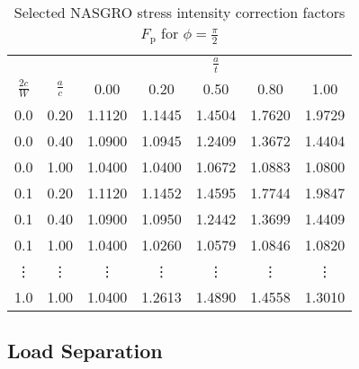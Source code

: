 \begin{table}
\caption[Selected NASGRO stress intensity correction factors $F_\text{p}$ for $\phi=\frac{\pi}{2}$]{\label{tab:nasgro-a-tip} Selected NASGRO stress intensity correction factors $F_\text{p}$ for $\phi=\frac{\pi}{2}$ \citep{nasgro2000}}
\centering
\begin{tabular}	{ccccccc} \toprule
& & \multicolumn{5}{c}{\(\frac{a}{t}\)} \\ \cmidrule(lr){3-7}
\multicolumn{1}{c}{\(\frac{2c}{W}\)} & \multicolumn{1}{c}{\(\frac{a}{c}\)} & 0.00 & 0.20 & 0.50 & 0.80 & 1.00 \\ \midrule
0.0 & 0.20 & 1.1120 & 1.1445 & 1.4504 & 1.7620 & 1.9729 \\
0.0 & 0.40 & 1.0900 & 1.0945 & 1.2409 & 1.3672 & 1.4404 \\
0.0 & 1.00 & 1.0400 & 1.0400 & 1.0672 & 1.0883 & 1.0800 \\
0.1 & 0.20 & 1.1120 & 1.1452 & 1.4595 & 1.7744 & 1.9847 \\
0.1 & 0.40 & 1.0900 & 1.0950 & 1.2442 & 1.3699 & 1.4409 \\
0.1 & 1.00 & 1.0400 & 1.0260 & 1.0579 & 1.0846 & 1.0820 \\
\vdots & \vdots & \vdots & \vdots & \vdots & \vdots & \vdots \\
1.0 & 1.00 & 1.0400 & 1.2613 & 1.4890 & 1.4558 & 1.3010 \\ \bottomrule
\end{tabular}
\end{table}

\subsection{Load Separation}

\label{sec:intro-load-separation}

